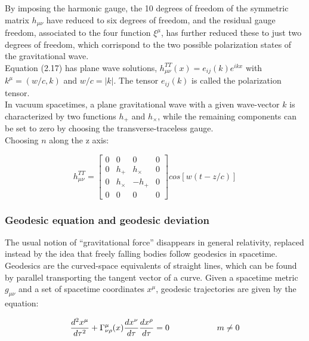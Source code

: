 \documentclass[binding=0.6cm, LaM]{sapthesis}
\begin{document}
	By imposing the harmonic gauge, the 10 degrees of freedom of the symmetric matrix $h_{\mu\nu}$ 
	have reduced to six degrees of freedom, and the residual gauge freedom,
	associated to the four function $\xi^{\mu}$, has further reduced these to just two degrees of freedom, 
	which corrispond to the two possible polarization states of the gravitational wave. \\
	Equation (2.17) has plane wave solutions, $h_{\mu\nu}^{TT}(x)=e_{ij}(k)e^{ikx}$ with 
	$k^{\mu}=(w/c,k)$ and $w/c=|k|$. The tensor $e_{ij}(k)$ is called the polarization tensor. \\

	In vacuum spacetimes, a plane gravitational wave with a given wave-vector $k$ is characterized 
	by two functions $h_+$ and $h_{\times}$, while the remaining components can be set to zero by
	choosing the transverse-traceless gauge. \\
	Choosing $n$ along the z axis:

		\begin{equation} 
		h_{\mu\nu}^{TT} = 
		\begin{bmatrix}
		0 & 0 & 0 & 0 \\
		0 & h_{+} & h_{\times} & 0 \\
		0 & h_{\times} & -h_{+} & 0 \\
		0 & 0 & 0 & 0 
		\end{bmatrix}cos[w(t-z/c)]
		\end{equation}

\subsubsection{Geodesic equation and geodesic deviation}

	The usual notion of “gravitational force” disappears in general relativity, replaced instead 
	by the idea that freely falling bodies follow geodesics in spacetime.
	Geodesics are the curved-space equivalents of straight lines, which can be found by 
	parallel transporting the tangent vector of a curve.
	Given a spacetime metric $g_{\mu\nu}$ and a set of spacetime coordinates $x^{\mu}$, 
	geodesic trajectories are given by the equation:

		\begin{equation}
		{{d^2x^{\mu}}\over{d\tau^2}} + \Gamma_{\nu\rho}^{\mu}(x){{dx^{\nu}}\over{d\tau}}{{dx^{\rho}}\over{d\tau}} = 0 \hspace*{2cm} m \neq 0
		\end{equation}
\end{document}
